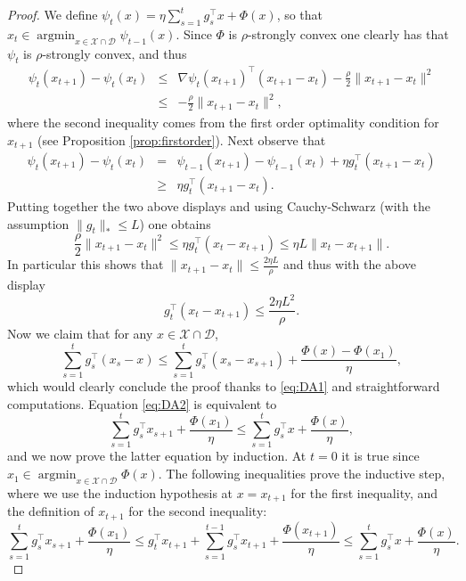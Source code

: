 \documentclass[openany]{now}
\newcommand{\cX}{\mathcal{X}}
\newcommand{\cD}{\mathcal{D}}
\newcommand{\argmin}{\mathop{\mathrm{argmin}}}
\begin{document}
\begin{proof}
We define $\psi_t(x) = \eta \sum_{s=1}^{t} g_s^{\top} x + \Phi(x)$, so that $x_t \in  \argmin_{x \in \mathcal{X} \cap \mathcal{D}} \psi_{t-1}(x)$. Since $\Phi$ is $\rho$-strongly convex one clearly has that $\psi_t$ is $\rho$-strongly convex, and thus
\begin{eqnarray*}
\psi_t(x_{t+1}) - \psi_t(x_t) & \leq & \nabla \psi_t(x_{t+1})^{\top}(x_{t+1} - x_{t}) - \frac{\rho}{2} \|x_{t+1} - x_t\|^2 \\
& \leq & - \frac{\rho}{2} \|x_{t+1} - x_t\|^2 ,
\end{eqnarray*}
where the second inequality comes from the first order optimality condition for $x_{t+1}$ (see Proposition \ref{prop:firstorder}). Next observe that
\begin{eqnarray*}
\psi_t(x_{t+1}) - \psi_t(x_t) & = & \psi_{t-1}(x_{t+1}) - \psi_{t-1}(x_t) + \eta g_t^{\top} (x_{t+1} - x_t) \\
& \geq & \eta g_t^{\top} (x_{t+1} - x_t) .
\end{eqnarray*}
Putting together the two above displays and using Cauchy-Schwarz (with the assumption $\|g_t\|_* \leq L$) one obtains
$$\frac{\rho}{2} \|x_{t+1} - x_t\|^2 \leq \eta g_t^{\top} (x_t - x_{t+1}) \leq \eta L \|x_t - x_{t+1} \|.$$
In particular this shows that $\|x_{t+1} - x_t\| \leq \frac{2 \eta L}{\rho}$ and thus with the above display
\begin{equation} \label{eq:DA1}
g_t^{\top} (x_t - x_{t+1}) \leq \frac{2 \eta L^2}{\rho} .
\end{equation}
Now we claim that for any $x \in \cX \cap \cD$,
\begin{equation} \label{eq:DA2}
\sum_{s=1}^t g_s^{\top} (x_s - x) \leq \sum_{s=1}^t g_s^{\top} (x_s - x_{s+1}) + \frac{\Phi(x) - \Phi(x_1)}{\eta} ,
\end{equation}
which would clearly conclude the proof thanks to \eqref{eq:DA1} and straightforward computations. Equation \eqref{eq:DA2} is equivalent to 
$$\sum_{s=1}^t g_s^{\top} x_{s+1} + \frac{\Phi(x_1)}{\eta} \leq \sum_{s=1}^t g_s^{\top} x + \frac{\Phi(x)}{\eta} ,$$
and we now prove the latter equation by induction. At $t=0$ it is true since $x_1 \in \argmin_{x \in \cX \cap \cD} \Phi(x)$. The following inequalities prove the inductive step, where we use the induction hypothesis at $x=x_{t+1}$ for the first inequality, and the definition of $x_{t+1}$ for the second inequality:
$$\sum_{s=1}^{t} g_s^{\top} x_{s+1} + \frac{\Phi(x_1)}{\eta} \leq g_{t}^{\top}x_{t+1} + \sum_{s=1}^{t-1} g_s^{\top} x_{t+1} + \frac{\Phi(x_{t+1})}{\eta} \leq \sum_{s=1}^{t} g_s^{\top} x + \frac{\Phi(x)}{\eta} .$$
\end{proof}
\end{document}
